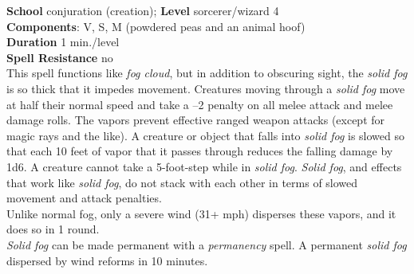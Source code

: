 \textbf{School} conjuration (creation); \textbf{Level} sorcerer/wizard 4\\
\textbf{Components}: V, S, M (powdered peas and an animal hoof)\\
\textbf{Duration} 1 min./level\\
\textbf{Spell Resistance} no\\
This spell functions like \textit{fog cloud}, but in addition to obscuring sight, the \textit{solid fog} is so thick that it impedes movement. Creatures moving through a \textit{solid fog} move at half their normal speed and take a –2 penalty on all melee attack and melee damage rolls. The vapors prevent effective ranged weapon attacks (except for magic rays and the like). A creature or object that falls into \textit{solid fog} is slowed so that each 10 feet of vapor that it passes through reduces the falling damage by 1d6. A creature cannot take a 5-foot-step while in \textit{solid fog}. \textit{Solid fog}, and effects that work like \textit{solid fog}, do not stack with each other in terms of slowed movement and attack penalties.\\
Unlike normal fog, only a severe wind (31+ mph) disperses these vapors, and it does so in 1 round.\\
\textit{Solid fog }can be made permanent with a \textit{permanency }spell. A permanent \textit{solid fog }dispersed by wind reforms in 10 minutes.\\

